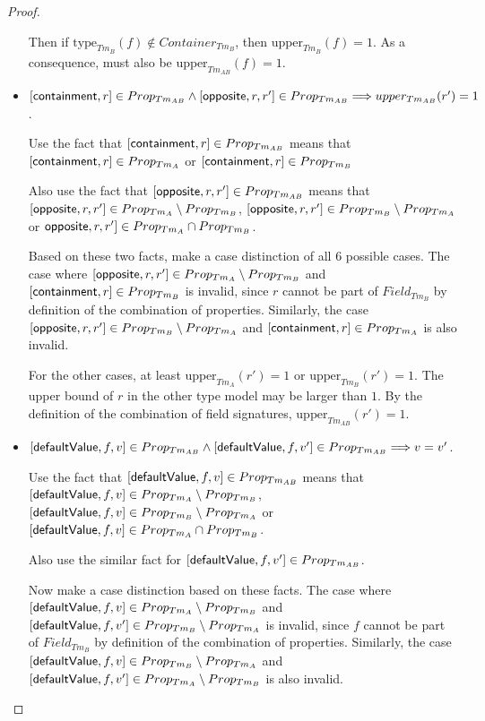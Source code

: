 \begin{proof}
\begin{itemize}
    Then if $\mathrm{type}_{Tm_{B}}(f) \not\in Container_{Tm_{B}}$, then $\mathrm{upper}_{Tm_{B}}(f) = 1$. As a consequence, must also be $\mathrm{upper}_{Tm_{AB}}(f) = 1$.


    \item $[ \mathsf{containment}, r ] \in Prop_{Tm_{AB}} \land [ \mathsf{opposite}, r, r' ] \in Prop_{Tm_{AB}} \Longrightarrow upper_{Tm_{AB}}(r') = 1$.
    
    Use the fact that $[ \mathsf{containment}, r ] \in Prop_{Tm_{AB}}$ means that $[ \mathsf{containment}, r ] \in Prop_{Tm_{A}}$ or $[ \mathsf{containment}, r ] \in Prop_{Tm_{B}}$
    
    Also use the fact that $[ \mathsf{opposite}, r, r' ] \in Prop_{Tm_{AB}}$ means that $[ \mathsf{opposite}, r, r' ] \in Prop_{Tm_{A}} \setminus Prop_{Tm_{B}}$, $[ \mathsf{opposite}, r, r' ] \in Prop_{Tm_{B}} \setminus Prop_{Tm_{A}}$ or $\mathsf{opposite}, r, r' ] \in Prop_{Tm_{A}} \cap Prop_{Tm_{B}}$.
    
    Based on these two facts, make a case distinction of all 6 possible cases. The case where $[ \mathsf{opposite}, r, r' ] \in Prop_{Tm_{A}} \setminus Prop_{Tm_{B}}$ and $[ \mathsf{containment}, r ] \in Prop_{Tm_{B}}$ is invalid, since $r$ cannot be part of $Field_{Tm_B}$ by definition of the combination of properties. Similarly, the case  $[ \mathsf{opposite}, r, r' ] \in Prop_{Tm_{B}} \setminus Prop_{Tm_{A}}$ and $[ \mathsf{containment}, r ] \in Prop_{Tm_{A}}$ is also invalid.
    
    For the other cases, at least $\mathrm{upper}_{Tm_{A}}(r') = 1$ or $\mathrm{upper}_{Tm_{B}}(r') = 1$. The upper bound of $r$ in the other type model may be larger than $1$. By the definition of the combination of field signatures, $\mathrm{upper}_{Tm_{AB}}(r') = 1$.
    
    
    \item $[ \mathsf{defaultValue}, f, v ] \in Prop_{Tm_{AB}} \land [ \mathsf{defaultValue}, f, v' ] \in Prop_{Tm_{AB}} \Longrightarrow v = v'$.
    
    Use the fact that $[ \mathsf{defaultValue}, f, v ] \in Prop_{Tm_{AB}}$ means that $[ \mathsf{defaultValue}, f, v ] \in Prop_{Tm_{A}} \setminus Prop_{Tm_{B}}$, $[ \mathsf{defaultValue}, f, v ] \in Prop_{Tm_{B}} \setminus Prop_{Tm_{A}}$ or $[ \mathsf{defaultValue}, f, v ] \in Prop_{Tm_{A}} \cap Prop_{Tm_{B}}$.
    
    Also use the similar fact for $[ \mathsf{defaultValue}, f, v' ] \in Prop_{Tm_{AB}}$.
    
    Now make a case distinction based on these facts. The case where $[ \mathsf{defaultValue}, f, v ] \in Prop_{Tm_{A}} \setminus Prop_{Tm_{B}}$ and $[ \mathsf{defaultValue}, f, v' ] \in Prop_{Tm_{B}} \setminus Prop_{Tm_{A}}$ is invalid, since $f$ cannot be part of $Field_{Tm_B}$ by definition of the combination of properties. Similarly, the case $[ \mathsf{defaultValue}, f, v ] \in Prop_{Tm_{B}} \setminus Prop_{Tm_{A}}$ and $[ \mathsf{defaultValue}, f, v' ] \in Prop_{Tm_{A}} \setminus Prop_{Tm_{B}}$ is also invalid.
    

\end{itemize}
\end{proof}
